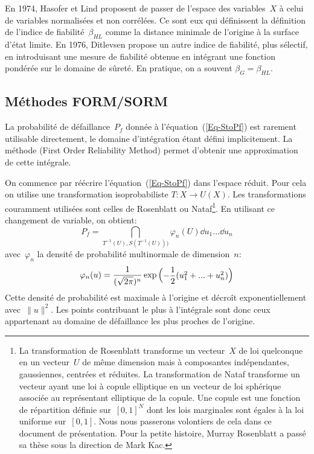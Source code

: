 \begin{histoire}
En 1974, Hasofer et Lind proposent de passer de l'espace des variables~$X$ à celui de variables normalisées et non corrélées. Ce sont eux qui définissent la définition de l'indice de fiabilité~$\beta_{HL}$ comme la distance minimale de l'origine à la surface d'état limite.
En 1976, Ditlevsen propose un autre indice de fiabilité, plus sélectif, en introduisant une mesure de fiabilité obtenue en intégrant une fonction pondérée sur le domaine de sûreté. En pratique, on a souvent $\beta_G=\beta_{HL}$.
\end{histoire}

\medskip
\subsection{Méthodes FORM/SORM}
La probabilité de défaillance~$P_f$ donnée à l'équation~(\ref{Eq-StoPf}) est rarement utilisable directement, le domaine d'intégration étant défini implicitement. La méthode  (First Order Reliability Method) permet d'obtenir une approximation de cette intégrale.

On commence par réécrire l'équation~(\ref{Eq-StoPf}) dans l'espace réduit. Pour cela on utilise une transformation isoprobabiliste $T : X \rightarrow U(X)$. Les transformations couramment utilisées sont celles de Rosenblatt ou Nataf\footnote{La transformation de Rosenblatt transforme un vecteur~$X$ de loi quelconque en un vecteur~$U$ de même dimension mais à composantes indépendantes, gaussiennes, centrées et réduites. La transformation de Nataf transforme un vecteur ayant une loi à copule elliptique en un vecteur de loi sphérique associée au représentant elliptique de la copule. Une copule est une fonction de répartition définie sur~$[0,1]^N$ dont les lois marginales sont égales à la loi uniforme sur~$[0,1]$. Nous nous passerons volontiers de cela dans ce document de présentation. Pour la petite histoire, Murray Rosenblatt a passé sa thèse sous la direction de Mark Kac.}. En utilisant ce changement de variable, on obtient:
\begin{equation}\label{Eq-StoPfU}
P_f=\dint_{T^{-1}(U),S(T^{-1}(U)))} \varphi_n(U) \dd u_1...\dd u_n
\end{equation}
avec~$\varphi_n$ la densité de probabilité multinormale de dimension~$n$:
\begin{equation}
\varphi_n(u)=\dfrac1{(\sqrt{2\pi})^n}\exp\begin{pmatrix}-\dfrac12(u_1^2+...+u_n^2)\end{pmatrix}
\end{equation}
Cette densité de probabilité est maximale à l'origine et décroît exponentiellement avec~$\|u\|^2$. Les points contribuant le plus à l'intégrale sont donc ceux appartenant au domaine de défaillance les plus proches de l'origine.

